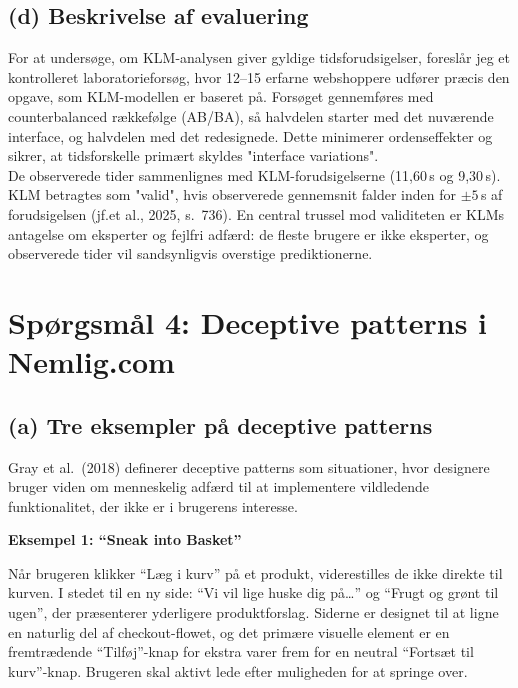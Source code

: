 \documentclass[12pt,a4paper]{article}
\begin{document}
\subsection*{(d) Beskrivelse af evaluering}
For at undersøge, om KLM-analysen giver gyldige tidsforudsigelser, foreslår jeg et kontrolleret laboratorieforsøg, hvor 12–15 erfarne webshoppere udfører præcis den opgave, som KLM-modellen er baseret på.
Forsøget gennemføres med counterbalanced rækkefølge (AB/BA), så halvdelen starter med det nuværende interface, og halvdelen med det redesignede. Dette minimerer ordenseffekter og sikrer, at tidsforskelle primært skyldes "interface variations".\\

De observerede tider sammenlignes med KLM-forudsigelserne (11{,}60\,s og 9{,}30\,s). KLM betragtes som "valid", hvis observerede gennemsnit falder inden for $\pm5$\,s af forudsigelsen (jf. et al., 2025, s.\ 736). 
En central trussel mod validiteten er KLMs antagelse om eksperter og fejlfri adfærd: de fleste brugere er ikke eksperter, og observerede tider vil sandsynligvis overstige prediktionerne. 

\newpage
\section*{Spørgsmål 4: Deceptive patterns i Nemlig.com}

\subsection*{(a) Tre eksempler på deceptive patterns}

Gray et al.\ (2018) definerer deceptive patterns som situationer, hvor designere bruger viden
om menneskelig adfærd til at implementere vildledende funktionalitet, der ikke er i brugerens
interesse.

\textbf{Eksempel 1: ``Sneak into Basket''}

Når brugeren klikker ``Læg i kurv'' på et produkt, viderestilles de ikke direkte til kurven.
I stedet til en ny side: ``Vi vil lige huske dig på\ldots'' og
``Frugt og grønt til ugen'', der præsenterer yderligere produktforslag. Siderne er designet
til at ligne en naturlig del af checkout-flowet, og det primære visuelle element er en
fremtrædende ``Tilføj''-knap for ekstra varer frem for en neutral ``Fortsæt til kurv''-knap.
Brugeren skal aktivt lede efter muligheden for at springe over.
\end{document}
